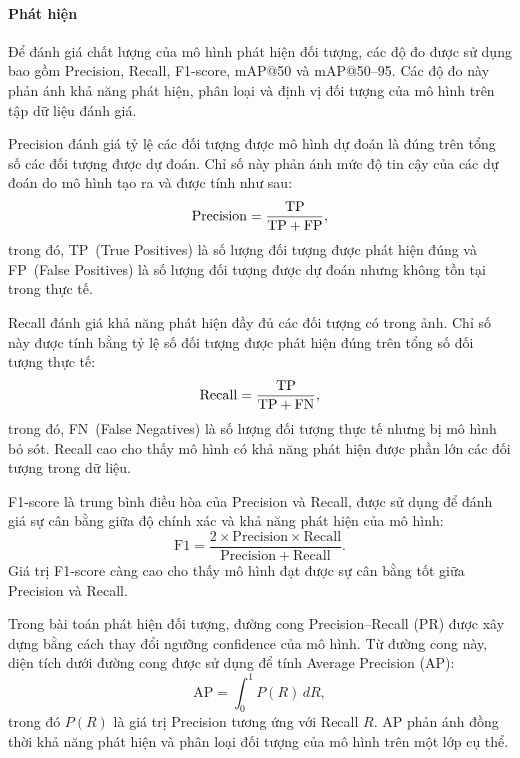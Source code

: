 \paragraph{Phát hiện}

\def\TP{\relax\ifmmode\mathrm{TP}\else TP\fi}
\def\FP{\relax\ifmmode\mathrm{FP}\else FP\fi}
\def\FN{\relax\ifmmode\mathrm{FN}\else FN\fi}

Để đánh giá chất lượng của mô hình phát hiện đối tượng, các độ đo được sử
dụng bao gồm Precision, Recall, F1-score, mAP@50 và mAP@50--95. Các độ
đo này phản ánh khả năng phát hiện, phân loại và định vị đối tượng của
mô hình trên tập dữ liệu đánh giá.

Precision đánh giá tỷ lệ các đối tượng được mô hình dự đoán là đúng trên
tổng số các đối tượng được dự đoán. Chỉ số này phản ánh mức độ tin cậy
của các dự đoán do mô hình tạo ra và được tính như sau:
\begin{equation}
\mathrm{Precision}
= \frac{\TP}{\TP + \FP},
\end{equation}
trong đó, \TP\ (True Positives) là số lượng đối tượng được phát hiện
đúng và \FP\ (False Positives) là số lượng đối tượng được dự đoán nhưng
không tồn tại trong thực tế.

Recall đánh giá khả năng phát hiện đầy đủ các đối tượng có trong ảnh.
Chỉ số này được tính bằng tỷ lệ số đối tượng được phát hiện đúng trên
tổng số đối tượng thực tế:
\begin{equation}
\mathrm{Recall}
= \frac{\TP}{\TP + \FN},
\end{equation}
trong đó, \FN\ (False Negatives) là số lượng đối tượng thực tế nhưng bị
mô hình bỏ sót. Recall cao cho thấy mô hình có khả năng phát hiện được
phần lớn các đối tượng trong dữ liệu.

F1-score là trung bình điều hòa của Precision và Recall, được sử dụng để
đánh giá sự cân bằng giữa độ chính xác và khả năng phát hiện của mô
hình:
\begin{equation}
\mathrm{F1}
= \frac{2 \times \mathrm{Precision} \times \mathrm{Recall}}
{\mathrm{Precision} + \mathrm{Recall}}.
\end{equation}
Giá trị F1-score càng cao cho thấy mô hình đạt được sự cân bằng tốt giữa
Precision và Recall.

Trong bài toán phát hiện đối tượng, đường cong Precision--Recall (PR)
được xây dựng bằng cách thay đổi ngưỡng confidence của mô hình. Từ
đường cong này, diện tích dưới đường cong được sử dụng để tính Average
Precision (AP):
\begin{equation}
  \mathrm{AP} = \int_0^1 P(R)\, dR,
\end{equation}
trong đó $P(R)$ là giá trị Precision tương ứng với Recall $R$. AP phản
ánh đồng thời khả năng phát hiện và phân loại đối tượng của mô hình trên
một lớp cụ thể.

